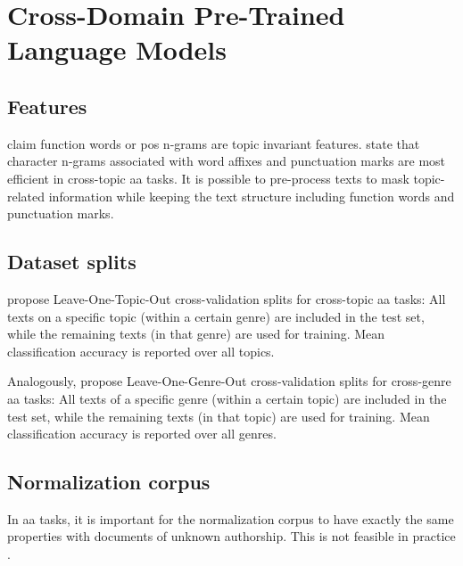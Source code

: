 \section{Cross-Domain Pre-Trained Language Models}
\label{sec:cross_domain_pre_trained_LM}

\subsection{Features}
\cite{barlas_cross_domain_2020} claim function words or \ac{pos} n-grams are topic invariant features.
\cite{barlas_cross_domain_2020} state that character n-grams associated with word affixes and punctuation marks 
are most efficient in cross-topic \ac{aa} tasks.
It is possible to pre-process texts to mask topic-related information while keeping the text structure including 
function words and punctuation marks.

\subsection{Dataset splits}
\label{sec:dataset_splits}

\citet{barlas_cross_domain_2020} propose Leave-One-Topic-Out cross-validation splits for cross-topic \ac{aa} tasks:
All texts on a specific topic (within a certain genre) are included in the test set,
while the remaining texts (in that genre) are used for training.
Mean classification accuracy is reported over all topics.

Analogously, \citet{barlas_cross_domain_2020} propose Leave-One-Genre-Out cross-validation splits for cross-genre \ac{aa} tasks:
All texts of a specific genre (within a certain topic) are included in the test set,
while the remaining texts (in that topic) are used for training.
Mean classification accuracy is reported over all genres.

\subsection{Normalization corpus} 
\label{sec:normalization_corpus}

In \ac{aa} tasks, it is important for the normalization corpus to have 
exactly the same properties with documents of unknown authorship.
This is not feasible in practice \cite{barlas_cross_domain_2020}.